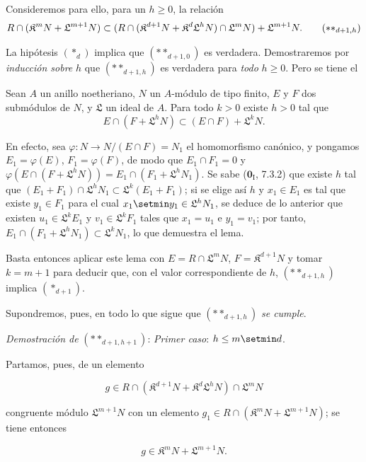 Consideremos para ello, para un $h\geq0$, la relación
\begin{equation}
  R\cap(\mathfrak K^mN+\mathfrak L^{m+1}N)\subset(R\cap(\mathfrak K^{d+1}N+\mathfrak K^d\mathfrak L^hN)\cap\mathfrak L^mN)+\mathfrak L^{m+1}N.
  \tag{$**_{d+1,h}$}
\end{equation}

La hipótesis $(*_d)$ implica que $(**_{d+1,0})$ es verdadera. Demostraremos por \emph{inducción sobre} $h$ que $(**_{d+1,h})$ es verdadera para \emph{todo} $h\geq0$. Pero se tiene el

\begin{lemma}[19.7.1.7]
\label{IV.19.7.1.7}
Sean $A$ un anillo noetheriano, $N$ un $A$-módulo de tipo finito, $E$ y $F$ dos submódulos de $N$, y $\mathfrak L$ un ideal de $A$. Para todo $k>0$ existe $h>0$ tal que
\[
  E\cap(F+\mathfrak L^hN)\subset(E\cap F)+\mathfrak L^kN.
\]
\end{lemma}

En efecto, sea $\varphi:N\to N/(E\cap F)=N_1$ el homomorfismo canónico, y pongamos $E_1=\varphi(E)$, $F_1=\varphi(F)$, de modo que $E_1\cap F_1=0$ y $\varphi(E\cap(F+\mathfrak L^hN))=E_1\cap(F_1+\mathfrak L^hN_1)$. Se sabe ($\mathbf{0}_{\mathrm I}$, 7.3.2) que existe $h$ tal que $(E_1+F_1)\cap\mathfrak L^hN_1\subset\mathfrak L^k(E_1+F_1)$; si se elige así $h$ y $x_1\in E_1$ es tal que existe $y_1\in F_1$ para el cual $x_1\setmin y_1\in\mathfrak L^hN_1$, se deduce de lo anterior que existen $u_1\in\mathfrak L^kE_1$ y $v_1\in\mathfrak L^kF_1$ tales que $x_1=u_1$ e $y_1=v_1$; por tanto, $E_1\cap(F_1+\mathfrak L^hN_1)\subset\mathfrak L^kN_1$, lo que demuestra el lema.

Basta entonces aplicar este lema con $E=R\cap\mathfrak L^mN$, $F=\mathfrak K^{d+1}N$ y tomar $k=m+1$ para deducir que, con el valor correspondiente de $h$, $(**_{d+1,h})$ implica $(*_{d+1})$.

Supondremos, pues, en todo lo que sigue que $(**_{d+1,h})$ \emph{se cumple}.

\begin{env}[19.7.1.8]
\label{IV.19.7.1.8}
\emph{Demostración de} $(**_{d+1,h+1})$: \emph{Primer caso}: $h\leq m\setmin d$.
\end{env}

Partamos, pues, de un elemento
\begin{env}[19.7.1.9]
\label{IV.19.7.1.9}
\[
  g\in R\cap(\mathfrak K^{d+1}N+\mathfrak K^d\mathfrak L^hN)\cap\mathfrak L^mN
\]
\end{env}
congruente módulo $\mathfrak L^{m+1}N$ con un elemento $g_1\in R\cap(\mathfrak K^mN+\mathfrak L^{m+1}N)$; se tiene entonces
\begin{env}[19.7.1.10]
\label{IV.19.7.1.10}
\[
  g\in\mathfrak K^mN+\mathfrak L^{m+1}N.
\]
\end{env}


